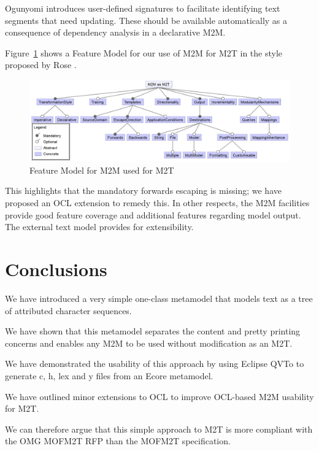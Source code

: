 \documentclass{llncs}
\begin{document}
Ogunyomi \cite{Signatures} introduces user-defined signatures to facilitate identifying text segments that need updating. These should be available automatically as a consequence of dependency analysis in a declarative M2M. 

Figure~\ref{fig:M2MM2TFeatureModel} shows a Feature Model for our use of M2M for M2T in the style proposed by Rose \cite{Feature Model}. 

\begin{figure}
	\begin{center}
		\includegraphics[width=4.9in]{M2MM2TFeatureModel.png}
	\end{center}
	\caption{Feature Model for M2M used for M2T}
	\label{fig:M2MM2TFeatureModel}
\end{figure}

This highlights that the mandatory forwards escaping is missing; we have proposed an OCL extension to remedy this. In other respects, the M2M facilities provide good feature coverage and additional features regarding model output. The external text model provides for extensibility.

\section{Conclusions}\label{Conclusions}

We have introduced a very simple one-class metamodel that models text as a tree of attributed character sequences.

We have shown that this metamodel separates the content and pretty printing concerns and enables any M2M to be used without modification as an M2T.

We have demonstrated the usability of this approach by using Eclipse QVTo to generate c, h, lex and y files from an Ecore metamodel.

We have outlined minor extensions to OCL to improve OCL-based M2M usability for M2T.

We can therefore argue that this simple approach to M2T is more compliant with the OMG MOFM2T RFP than the MOFM2T specification.
\end{document}
